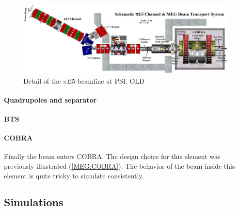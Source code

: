 \begin{refsection}
        \begin{figure}
            \centering
            \includegraphics[width = \textwidth]{Figures/MEG/pie5_beamline.png}
            \caption{Detail of the $\pi E5$ beamline at PSI. OLD}
            \label{fig:pie5}
        \end{figure}

        \paragraph{Quadrupoles and separator}
        \paragraph{BTS}
        \paragraph{COBRA} Finally the beam enters COBRA. 
        The design choice for this element was previously illustrated (\ref{MEG:COBRA}). 
        The behavior of the beam inside this element is quite tricky to simulate consistently.
        
    \subsection{Simulations}
        \paragraph{\gfb}

\end{refsection}
